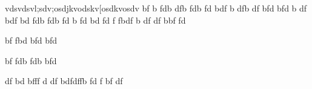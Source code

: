 vdsvdsvl;sdv;osdjkvodskv[osdkvosdv
bf
b
fdb
dfb
fdb
fd
bdf
b
dfb
df
bfd
bfd
b
df
bdf
bd
fdb
fdb
fd
b
fd
bd
fd
f
fbdf
b
df
df
bbf
fd

bf
fbd
bfd
bfd

bf
fdb
fdb
bfd

df
bd
bfff
d
df
bdfdffb
fd
f
bf
df
